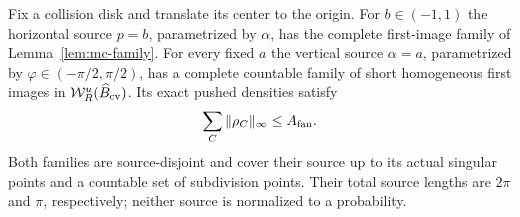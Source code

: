 \begin{lemma}
\label{lem:cs-first}
Fix a collision disk and translate its center to the origin.
For $b\in(-1,1)$ the horizontal source $p=b$, parametrized by
$\alpha$, has the complete first-image family of
Lemma~\ref{lem:mc-family}.  For every fixed $a$ the vertical source
$\alpha=a$, parametrized by $\varphi\in(-\pi/2,\pi/2)$,
has a complete countable family of short homogeneous first images in
$\mathcal W_R^u(\widehat B_{\rm cv})$.  Its exact pushed densities
satisfy
\begin{equation}\label{eq:cs-fan-density-sum}
                    \sum_C\|\rho_C\|_\infty\le A_{\rm fan}.
\end{equation}
Both families are source-disjoint and cover their source up to its
actual singular points and a countable set of subdivision points.
Their total source lengths are $2\pi$ and $\pi$, respectively;
neither source is normalized to a probability.
\end{lemma}

